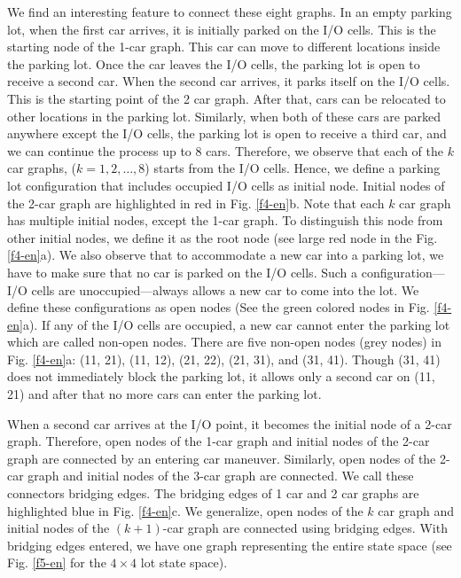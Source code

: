 We find an interesting feature to connect these eight graphs. In an empty parking lot, when the first car arrives, it is initially parked on the I/O cells. This is the starting node of the 1-car graph. This car can move to different locations inside the parking lot. Once the car leaves the I/O cells, the parking lot is open to receive a second car. When the second car arrives, it parks itself on the I/O cells. This is the starting point of the 2 car graph. After that, cars can be relocated to other locations in the parking lot. Similarly, when both of these cars are parked anywhere except the I/O cells, the parking lot is open to receive a third car, and we can continue the process up to 8 cars. Therefore, we observe that each of the $k$ car graphs, ($k = 1, 2, \dots, 8$) starts from the I/O cells. Hence, we define a parking lot configuration that includes occupied I/O cells as initial node. Initial nodes of the 2-car graph are highlighted in red in Fig. \ref{f4-en}b. Note that each $k$ car graph has multiple initial nodes, except the 1-car graph. To distinguish this node from other initial nodes, we define it as the root node (see large red node in the Fig. \ref{f4-en}a). We also observe that to accommodate a new car into a parking lot, we have to make sure that no car is parked on the I/O cells. Such a configuration—I/O cells are unoccupied—always allows a new car to come into the lot. We define these configurations as open nodes (See the green colored nodes in Fig. \ref{f4-en}a). If any of the I/O cells are occupied, a new car cannot enter the parking lot which are called non-open nodes. There are five non-open nodes (grey nodes) in Fig. \ref{f4-en}a: (11, 21), (11, 12), (21, 22), (21, 31), and (31, 41). Though (31, 41) does not immediately block the parking lot, it allows only a second car on (11, 21) and after that no more cars can enter the parking lot.


When a second car arrives at the I/O point, it becomes the initial node of a 2-car graph. Therefore, open nodes of the 1-car graph and initial nodes of the 2-car graph are connected by an entering car maneuver. Similarly, open nodes of the 2-car graph and initial nodes of the 3-car graph are connected. We call these connectors bridging edges. The bridging edges of 1 car and 2 car graphs are highlighted blue in Fig. \ref{f4-en}c. We generalize, open nodes of the $k$ car graph and initial nodes of the $(k + 1)$-car graph are connected using bridging edges. With bridging edges entered, we have one graph representing the entire state space (see Fig. \ref{f5-en} for the $4 \times 4$ lot state space).

